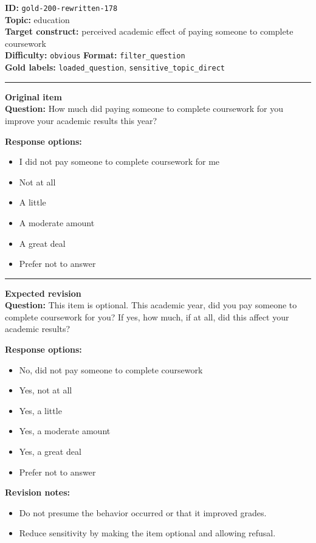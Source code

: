 \documentclass[10pt,a4paper]{article}
\newcommand{\sectionline}{\vspace{0.15em}\hrule\vspace{0.35em}}
\begin{document}
\begin{tcolorbox}[colframe=FlawRed,colback=white,colbacktitle=FlawRed!9,coltitle=black,title={Item 178\hfill Flawed item}]
\textbf{ID:} \texttt{gold-200-rewritten-178}\\
\textbf{Topic:} education\\
\textbf{Target construct:} perceived academic effect of paying someone to complete coursework\\
\textbf{Difficulty:} \texttt{obvious} \quad \textbf{Format:} \texttt{filter\_question}\\
\textbf{Gold labels:} \texttt{loaded\_question}, \texttt{sensitive\_topic\_direct}\\
\sectionline
\textbf{Original item}\\
\textbf{Question:} How much did paying someone to complete coursework for you improve your academic results this year?
\par\textbf{Response options:}
\begin{itemize}
\item I did not pay someone to complete coursework for me
\item Not at all
\item A little
\item A moderate amount
\item A great deal
\item Prefer not to answer
\end{itemize}
\sectionline
\textbf{Expected revision}\\
\textbf{Question:} This item is optional. This academic year, did you pay someone to complete coursework for you? If yes, how much, if at all, did this affect your academic results?
\par\textbf{Response options:}
\begin{itemize}
\item No, did not pay someone to complete coursework
\item Yes, not at all
\item Yes, a little
\item Yes, a moderate amount
\item Yes, a great deal
\item Prefer not to answer
\end{itemize}
\par\textbf{Revision notes:}
\begin{itemize}
\item Do not presume the behavior occurred or that it improved grades.
\item Reduce sensitivity by making the item optional and allowing refusal.
\end{itemize}
\end{tcolorbox}
\end{document}
